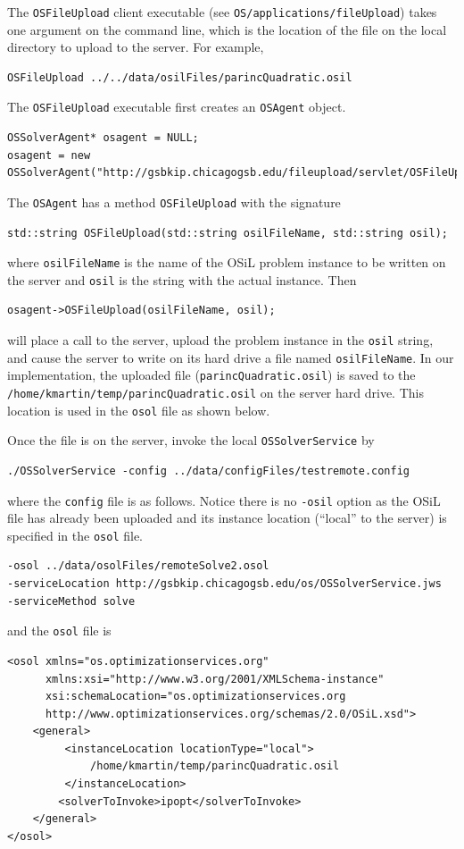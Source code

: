 \documentclass[11pt]{article}
\renewcommand{\_}{{\char"5F}}
\renewcommand{\{}{{\char"7B}}
\renewcommand{\}}{{\char"7D}}
\renewcommand{\^}{{\char"0D}}
\renewcommand{\'}{{\char"0D}}
\begin{document}
\begin{enumerate}[Step 1:]
The {\tt OSFileUpload} client executable (see {\tt OS/applications/fileUpload}) takes one argument on the command line,
which is the location of the file on the local directory to upload to the server. For example,
\begin{verbatim}
OSFileUpload ../../data/osilFiles/parincQuadratic.osil
\end{verbatim}
The {\tt OSFileUpload} executable first creates an {\tt OSAgent} object.
\begin{verbatim}
OSSolverAgent* osagent = NULL;
osagent = new OSSolverAgent("http://gsbkip.chicagogsb.edu/fileupload/servlet/OSFileUpload");
\end{verbatim}
The {\tt OSAgent}  has a method {\tt OSFileUpload} with the signature
\begin{verbatim}
std::string OSFileUpload(std::string osilFileName, std::string osil);
\end{verbatim}
where {\tt osilFileName} is  the name of the OSiL problem instance to be written on the server and {\tt osil}
is the string with the actual instance. Then
\begin{verbatim}
osagent->OSFileUpload(osilFileName, osil);
\end{verbatim}
will place a call to the server, upload the problem instance in the {\tt osil} string, and cause the server
to write on its hard drive a file named {\tt osilFileName}. In our implementation, the uploaded file
({\tt parincQuadratic.osil}) is saved to the {\tt/home/kmartin/temp/parincQuadratic.osil} on the server hard drive.
This location is used in the {\tt osol} file as shown below.

Once the file is on the server, invoke the local {\tt OSSolverService} by
\begin{verbatim}
./OSSolverService -config ../data/configFiles/testremote.config
\end{verbatim}
where the {\tt config} file is as follows. Notice there is no {\tt -osil}  option as the OSiL file has already
been uploaded and its instance location (``local'' to the server) is specified in the {\tt osol} file.
\begin{verbatim}
-osol ../data/osolFiles/remoteSolve2.osol
-serviceLocation http://gsbkip.chicagogsb.edu/os/OSSolverService.jws
-serviceMethod solve
\end{verbatim}
and the {\tt osol} file is
\begin{verbatim}
<osol xmlns="os.optimizationservices.org"
      xmlns:xsi="http://www.w3.org/2001/XMLSchema-instance"
      xsi:schemaLocation="os.optimizationservices.org
      http://www.optimizationservices.org/schemas/2.0/OSiL.xsd">
    <general>
         <instanceLocation locationType="local">
             /home/kmartin/temp/parincQuadratic.osil
         </instanceLocation>
        <solverToInvoke>ipopt</solverToInvoke>      
    </general>
</osol>
\end{verbatim}


\end{enumerate}
\end{document}
